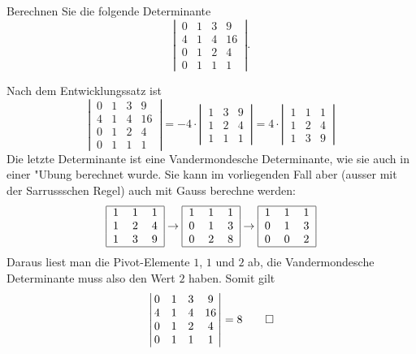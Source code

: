 Berechnen Sie die folgende Determinante
\[
\left|\,\begin{matrix}
0&1&3&9\\
4&1&4&16\\
0&1&2&4\\
0&1&1&1
\end{matrix}\,\right|.
\]

\begin{loesung}
Nach dem Entwicklungssatz ist
\[
\left|\,\begin{matrix}
0&1&3&9\\
4&1&4&16\\
0&1&2&4\\
0&1&1&1
\end{matrix}\,\right|
=-4\cdot\left|\,\begin{matrix}
1&3&9\\
1&2&4\\
1&1&1
\end{matrix}\,\right|
=
4\cdot\left|\,\begin{matrix}
1&1&1\\
1&2&4\\
1&3&9
\end{matrix}\,\right|
\]
Die letzte Determinante ist eine Vandermondesche Determinante,
wie sie auch in einer "Ubung berechnet wurde. Sie kann im vorliegenden
Fall aber (ausser mit der Sarrussschen Regel) auch mit Gauss
berechne werden:
\[
\begin{tabular}{|ccc|}
\hline
1&1&1\\
1&2&4\\
1&3&9\\
\hline
\end{tabular}
\rightarrow
\begin{tabular}{|ccc|}
\hline
1&1&1\\
0&1&3\\
0&2&8\\
\hline
\end{tabular}
\rightarrow
\begin{tabular}{|ccc|}
\hline
1&1&1\\
0&1&3\\
0&0&2\\
\hline
\end{tabular}
\]
Daraus liest man die Pivot-Elemente $1$, $1$ und $2$ ab, die
Vandermondesche Determinante muss also den Wert $2$ haben.
Somit gilt
\[
\left|\,\begin{matrix}
0&1&3&9\\
4&1&4&16\\
0&1&2&4\\
0&1&1&1
\end{matrix}\,\right|
= 8
\qedhere
\]
\end{loesung}

